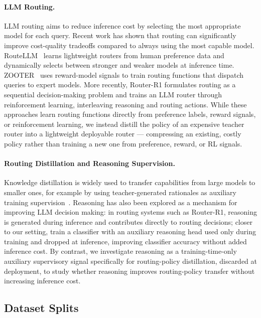 \documentclass{article}
\begin{document}
\paragraph{LLM Routing.} LLM routing aims to reduce inference cost by selecting the most appropriate model for each query. Recent work has shown that routing can significantly improve cost-quality tradeoffs compared to always using the most capable model. RouteLLM~\citep{ong2024routellm} learns lightweight routers from human preference data and dynamically selects between stronger and weaker models at inference time. ZOOTER~\citep{lu2024zooter} uses reward-model signals to train routing functions that dispatch queries to expert models. More recently, Router-R1\citep{zhang2025routerr1} formulates routing as a sequential decision-making problem and trains an LLM router through reinforcement learning, interleaving reasoning and routing actions.
While these approaches learn routing functions directly from preference labels, reward signals, or reinforcement learning, we instead distill the policy of an expensive teacher router into a lightweight deployable router — compressing an existing, costly policy rather than training a new one from preference, reward, or RL signals.

\paragraph{Routing Distillation and Reasoning Supervision.}

Knowledge distillation is widely used to transfer capabilities from large models to smaller ones, for example by using teacher-generated rationales as auxiliary training supervision~\citep{hsieh2023distilling}. Reasoning has also been explored as a mechanism for improving LLM decision making: in routing systems such as Router-R1, reasoning is generated during inference and contributes directly to routing decisions; closer to our setting, \citet{xu2025dualhead} train a classifier with an auxiliary reasoning head used only during training and dropped at inference, improving classifier accuracy without added inference cost. By contrast, we investigate reasoning as a training-time-only auxiliary supervisory signal specifically for routing-policy distillation, discarded at deployment, to study whether reasoning improves routing-policy transfer without increasing inference cost.

\subsection{Dataset Splits}
\label{sec:splits-appendix}
\end{document}
